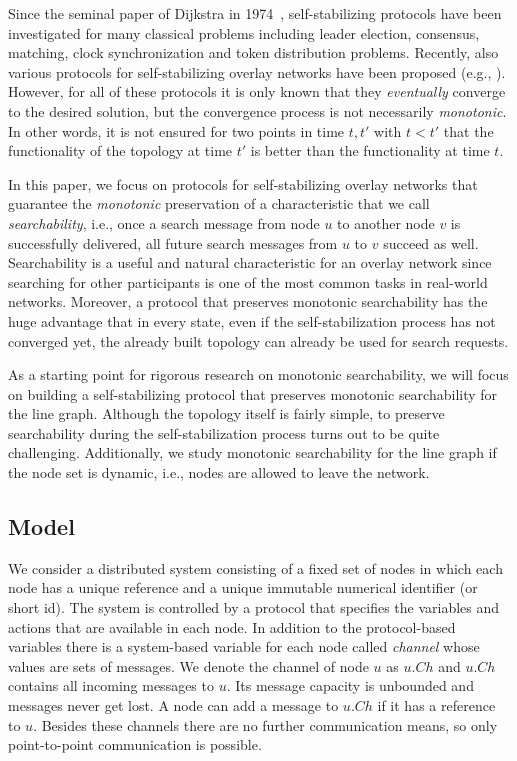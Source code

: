 \documentclass[a4paper,USenglish]{lipics}
\begin{document}
Since the seminal paper of Dijkstra in 1974~\cite{Dijkstra74}, self-stabilizing protocols have been investigated for many classical problems including leader election, consensus, matching, clock synchronization and token distribution problems.
Recently, also various protocols for self-stabilizing overlay networks have been proposed (e.g., \cite{corona,JRSST09,DolevT2013,JacobRSS2012,DolevK08, AspnesW07,KniesburgesKS12,rechord,DBLP:journals/tcs/BernsGP13}). 
However, for all of these protocols it is only known that they \emph{eventually} converge to the desired solution, but the convergence process is not necessarily \emph{monotonic}. 
In other words, it is not ensured for two points in time $t, t'$ with $t<t'$ that the functionality of the topology at time $t'$ is better than the functionality at time $t$.

In this paper, we focus on protocols for self-stabilizing overlay networks that guarantee the \emph{monotonic} preservation of a characteristic that we call \emph{searchability}, i.e., once a search message from node $u$ to another node $v$ is successfully delivered, all future search messages from $u$ to $v$ succeed as well. 
Searchability is a useful and natural characteristic for an overlay network since searching for other participants is one of the most common tasks in real-world networks. 
Moreover, a protocol that preserves monotonic searchability has the huge advantage that in every state, even if the self-stabilization process has not converged yet, the already built topology can already be used for search requests.

As a starting point for rigorous research on monotonic searchability, we will focus on building a self-stabilizing protocol that preserves monotonic searchability for the line graph. 
Although the topology itself is fairly simple, to preserve searchability during the self-stabilization process turns out to be quite challenging. 
Additionally, we study monotonic searchability for the line graph if the node set is dynamic, i.e., nodes are allowed to leave the network.


\subsection{Model}
We consider a distributed system consisting of a fixed set of nodes in which each node has a unique reference and a unique immutable numerical identifier (or short id).
The system is controlled by a protocol that specifies the variables and actions that are available in each node. 
In addition to the protocol-based variables there is a system-based variable for each node called \emph{channel} whose values are sets of messages. 
We denote the channel of node $u$ as $u.Ch$ and $u.Ch$ contains all incoming messages to $u$. 
Its message capacity is unbounded and messages never get lost.
A node can add a message to $u.Ch$ if it has a reference to $u$.
Besides these channels there are no further communication means, so only point-to-point communication is possible.
\end{document}
